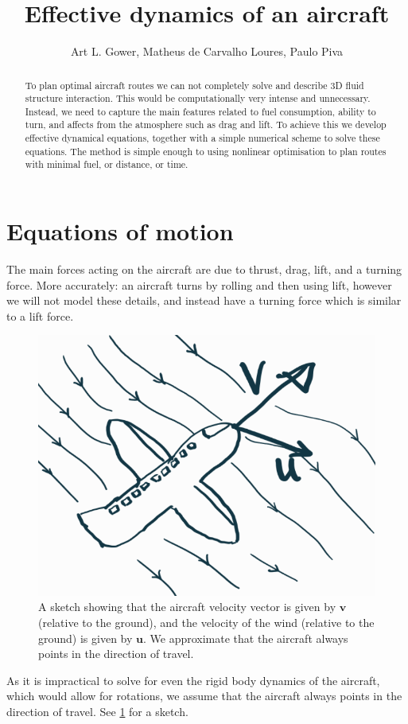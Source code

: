 \documentclass{article}
\title{Effective dynamics of an aircraft}
\author{Art L. Gower, Matheus de Carvalho Loures, Paulo Piva}
\renewcommand{\vec}[1]{\boldsymbol{#1}}
\begin{document}
\maketitle

\begin{abstract}
    To plan optimal aircraft routes we can not completely solve and describe 3D fluid structure interaction. This would be computationally very intense and unnecessary. Instead, we need to capture the main features related to fuel consumption, ability to turn, and affects from the atmosphere such as drag and lift. To achieve this we develop effective dynamical equations, together with a simple numerical scheme to solve these equations. The method is simple enough to using nonlinear optimisation to plan routes with minimal fuel, or distance, or time.  
\end{abstract}

\section{Equations of motion}
The main forces acting on the aircraft are due to thrust, drag, lift, and a turning force. More accurately: an aircraft turns by rolling and then using lift, however we will not model these details, and instead have a turning force which is similar to a lift force.

\begin{figure}[ht]
    \centering
    \includegraphics[width = 0.4\linewidth]{"plane-sketch.png"}
    \caption{A sketch showing that the aircraft velocity vector is given by $\vec v$ (relative to the ground), and the velocity of the wind (relative to the ground) is given by $\vec u$. We approximate that the aircraft always points in the direction of travel.}
    \label{fig:plane-sketch}
\end{figure}

As it is impractical to solve for even the rigid body dynamics of the aircraft, which would allow for rotations, we assume that the aircraft always points in the direction of travel. See \cref{fig:plane-sketch} for a sketch. 
\end{document}
